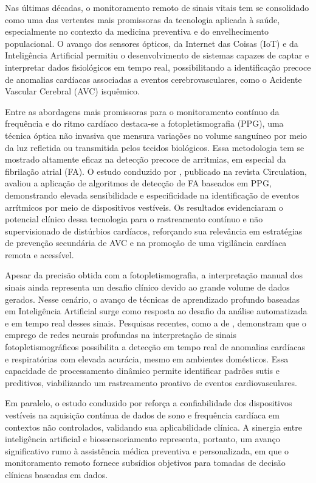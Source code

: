 Nas últimas décadas, o monitoramento remoto de sinais vitais tem se consolidado como uma das vertentes mais promissoras da tecnologia aplicada à saúde, especialmente no contexto da medicina preventiva e do envelhecimento populacional. O avanço dos sensores ópticos, da Internet das Coisas (IoT) e da Inteligência Artificial permitiu o desenvolvimento de sistemas capazes de captar e interpretar dados fisiológicos em tempo real, possibilitando a identificação precoce de anomalias cardíacas associadas a eventos cerebrovasculares, como o Acidente Vascular Cerebral (AVC) isquêmico.

Entre as abordagens mais promissoras para o monitoramento contínuo da frequência e do ritmo cardíaco destaca-se a fotopletismografia (PPG), uma técnica óptica não invasiva que mensura variações no volume sanguíneo por meio da luz refletida ou transmitida pelos tecidos biológicos. Essa metodologia tem se mostrado altamente eficaz na detecção precoce de arritmias, em especial da fibrilação atrial (FA). O estudo conduzido por \textcite{Lubitz2022}, publicado na revista Circulation, avaliou a aplicação de algoritmos de detecção de FA baseados em PPG, demonstrando elevada sensibilidade e especificidade na identificação de eventos arrítmicos por meio de dispositivos vestíveis. Os resultados evidenciaram o potencial clínico dessa tecnologia para o rastreamento contínuo e não supervisionado de distúrbios cardíacos, reforçando sua relevância em estratégias de prevenção secundária de AVC e na promoção de uma vigilância cardíaca remota e acessível.

Apesar da precisão obtida com a fotopletismografia, a interpretação manual dos sinais ainda representa um desafio clínico devido ao grande volume de dados gerados. Nesse cenário, o avanço de técnicas de aprendizado profundo baseadas em Inteligência Artificial surge como resposta ao desafio da análise automatizada e em tempo real desses sinais. Pesquisas recentes, como a de \textcite{Charlton2023}, demonstram que o emprego de redes neurais profundas na interpretação de sinais fotopletismográficos possibilita a detecção em tempo real de anomalias cardíacas e respiratórias com elevada acurácia, mesmo em ambientes domésticos. Essa capacidade de processamento dinâmico permite identificar padrões sutis e preditivos, viabilizando um rastreamento proativo de eventos cardiovasculares.

Em paralelo, o estudo conduzido por \textcite{DeVries2023} reforça a confiabilidade dos dispositivos vestíveis na aquisição contínua de dados de sono e frequência cardíaca em contextos não controlados, validando sua aplicabilidade clínica. A sinergia entre inteligência artificial e biossensoriamento representa, portanto, um avanço significativo rumo à assistência médica preventiva e personalizada, em que o monitoramento remoto fornece subsídios objetivos para tomadas de decisão clínicas baseadas em dados.

